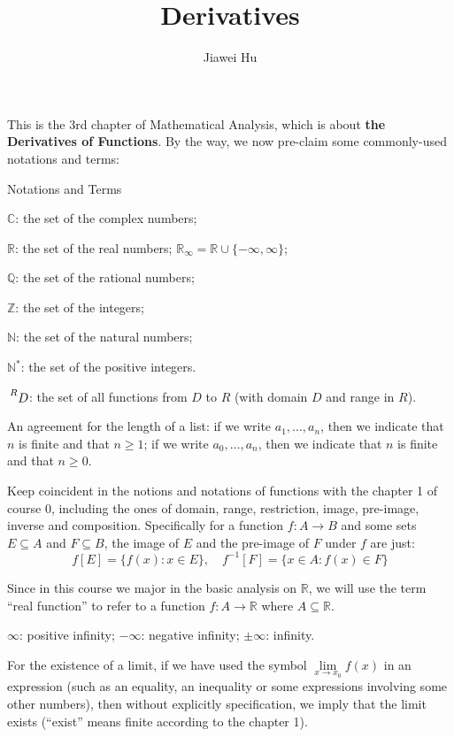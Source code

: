 \documentclass{article}
\title{\LARGE \textbf{Derivatives}}
\author{\large Jiawei Hu}
\begin{document}
\maketitle

This is the 3rd chapter of Mathematical Analysis, which is about \textbf{the Derivatives of Functions}. By the way, we now pre-claim some commonly-used notations and terms:
\begin{Df}{Notations and Terms}
    \begin{compactenum}
        \item $\mathbb{C}$: the set of the complex numbers;
        \item $\mathbb{R}$: the set of the real numbers; $\mathbb{R}_\infty = \mathbb{R}\cup\{-\infty, \infty\}$;
        \item $\mathbb{Q}$: the set of the rational numbers;
        \item $\mathbb{Z}$: the set of the integers;
        \item $\mathbb{N}$: the set of the natural numbers;
        \item $\mathbb{N^\ast}$: the set of the positive integers.
        \item $\sideset{^R}{}{\mathop{D}}$: the set of all functions from $D$ to $R$ (with domain $D$ and range in $R$).
        \item An agreement for the length of a list: if we write $a_1, \dots, a_n$, then we indicate that $n$ is finite and that $n\geq 1$; if we write $a_0, \dots, a_n$, then we indicate that $n$ is finite and that $n\geq 0$.
        \item Keep coincident in the notions and notations of functions with the chapter 1 of course 0, including the ones of domain, range, restriction, image, pre-image, inverse and composition. Specifically for a function $f: A\rightarrow B$ and some sets $E\subseteq A$ and $F\subseteq B$, the image of $E$ and the pre-image of $F$ under $f$ are just:
        $$f[E] = \{f(x): x\in E\},\quad f^{-1}[F] = \{x\in A: f(x)\in F\}$$
        \item Since in this course we major in the basic analysis on $\mathbb{R}$, we will use the term ``real function'' to refer to a function $f: A\rightarrow \mathbb{R}$ where $A\subseteq \mathbb{R}$.
        \item $\infty$: positive infinity; $-\infty$: negative infinity; $\pm\infty$: infinity.
        \item For the existence of a limit, if we have used the symbol $\lim\limits_{x\to x_0} f(x)$ in an expression (such as an equality, an inequality or some expressions involving some other numbers), then without explicitly specification, we imply that the limit exists (``exist'' means finite according to the chapter 1).

\end{compactenum}
\end{Df}
\end{document}
